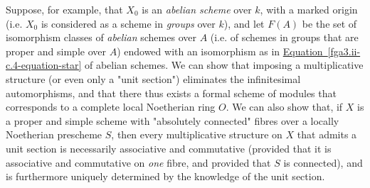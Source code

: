   Suppose, for example, that \(X_0\) is an \emph{abelian scheme} over \(k\), with a marked origin (i.e. \(X_0\) is considered as a scheme in \emph{groups} over \(k\)), and let \(F(A)\) be the set of isomorphism classes of \emph{abelian} schemes over \(A\) (i.e. of schemes in groups that are proper and simple over \(A\)) endowed with an isomorphism as in \hyperref[fga3.ii-c.4-equation-star]{Equation~\ref*{fga3.ii-c.4-equation-star}} of abelian schemes.
  We can show that imposing a multiplicative structure (or even only a "unit section") eliminates the infinitesimal automorphisms, and that there thus exists a formal scheme of modules that corresponds to a complete local Noetherian ring \(O\).
  We can also show that, if \(X\) is a proper and simple scheme with "absolutely connected" fibres over a locally Noetherian prescheme \(S\), then every multiplicative structure on \(X\) that admits a unit section is necessarily associative and commutative (provided that it is associative and commutative on \emph{one} fibre, and provided that \(S\) is connected), and is furthermore uniquely determined by the knowledge of the unit section.
  
